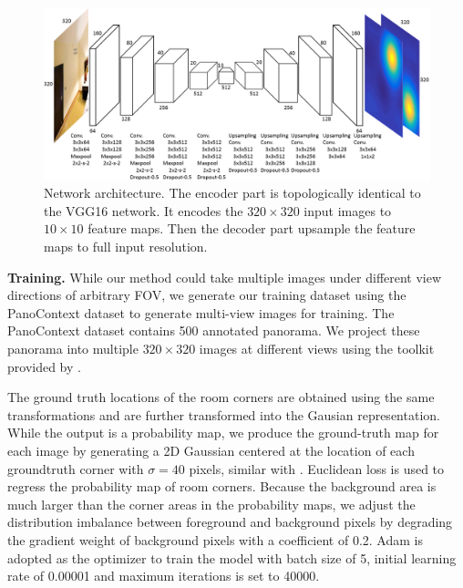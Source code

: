 \begin{figure}
	\centering
	\includegraphics[width=\linewidth]{figs/network.png}
	\caption{Network architecture. The encoder part is topologically identical to the VGG16 network. It encodes the $320 \times 320$ input images to $10 \times 10$ feature maps. Then the decoder part upsample the feature maps to full input resolution. }
	\label{fig:network}
\end{figure}

\noindent\textbf{Training.} 
While our method could take multiple images under different view directions of arbitrary FOV, we generate our training dataset using the PanoContext dataset \cite{zhang2014panocontext} to generate multi-view images for training. 
The PanoContext dataset contains 500 annotated panorama. We project these panorama into multiple $320 \times 320$ images at different views using the toolkit provided by \cite{zhang2014panocontext}. 
%

The ground truth locations of the room corners are obtained using the same transformations and are further transformed into the Gausian representation. 
While the output is a probability map, we produce the ground-truth map for each image by generating a 2D Gaussian centered at the location of each groundtruth corner with $\sigma=40$ pixels, similar with \cite{LeeRoomNet17,tompson2014joint}.
%
Euclidean loss is used to regress the probability map of room corners. 
Because the background area is much larger than the corner areas in the probability maps, we adjust the distribution imbalance between foreground and background pixels by degrading the gradient weight of background pixels with a coefficient of 0.2.
Adam is adopted as the optimizer to train the model with batch size of 5, initial learning rate of 0.00001 and maximum iterations is set to 40000.

